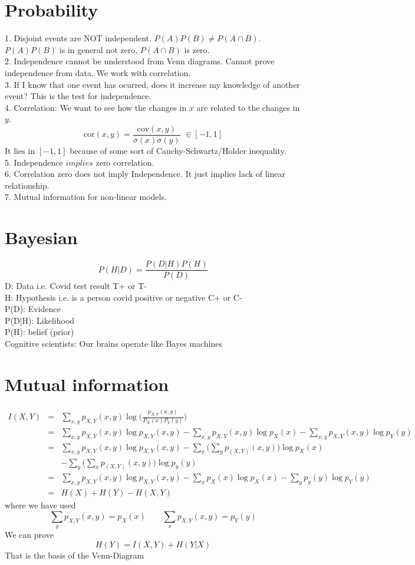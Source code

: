 \documentclass{article}
\newcommand{\beq}{\begin{equation}}
\newcommand{\eeq}{\end{equation}}
\newcommand{\ber}{\begin{eqnarray}}
\newcommand{\eer}{\end{eqnarray}}
\begin{document}
\section{Probability}
1. Disjoint events are NOT independent. $P(A)P(B)\ne{}P(A\cap{B})$. $P(A)P(B)$ is in general not zero, $P(A\cap{B})$ is zero.\\
2. Independence cannot be understood from Venn diagrams. Cannot prove independence from data. We work with correlation. \\
3. If I know that one event has ocurred, does it increase my knowledge of another event? This is the test for independence. \\
4. Correlation: We want to see how the changes in $x$ are related to the changes in $y$.\\
\beq
\text{cor}(x,y) = \frac{\text{cov}(x,y)}{\sigma(x)\sigma(y)}\,\,\in [-1,1] 
\eeq
It lies in $[-1,1]$ because of some sort of Cauchy-Schwartz/Holder inequality.\\
5. Independence $implies$ zero correlation.\\
6. Correlation zero does not imply Independence. It just implies lack of linear relationship.\\
7. Mutual information for non-linear models.
%
%
%
\section{Bayesian}
\beq
P(H|D) = \frac{P(D|H)P(H)}{P(D)}
\eeq
D: Data i.e. Covid test result T+ or T-\\
H: Hypothesis i.e. is a person covid positive or negative C+ or C-\\
P(D): Evidence\\
P(D|H): Likelihood\\
P(H): belief (prior)\\
Cognitive scientists: Our brains operate like Bayes machines
%
%
%
\section{Mutual information}
\ber
I(X,Y) &=& \sum_{x,y}p_{X,Y}(x,y)\log\Big(\frac{p_{X,Y}(x,y)}{P_X(x)P_Y(y)}\Big)\\
&=& \sum_{x,y}p_{X,Y}(x,y)\log{p_{X,Y}(x,y)} - \sum_{x,y}p_{X,Y}(x,y)\log{p_X(x)} - \sum_{x,y}p_{X,Y}(x,y)\log{p_Y(y)} \\
&=& \sum_{x,y}p_{X,Y}(x,y)\log{p_{X,Y}(x,y)} - \sum_{x}\Big(\sum_{y}p_(X,Y)(x,y)\Big)\log{p_X(x)} \nonumber \\ && - \sum_{y}\Big(\sum_{x}p_(X,Y)(x,y)\Big)\log{p_y(y)} \\
&=& \sum_{x,y}p_{X,Y}(x,y)\log{p_{X,Y}(x,y)} - \sum_{x}p_{X}(x)\log{p_X(x)} - \sum_{y}p_{y}(y)\log{p_Y(y)} \\
&=& H(X) + H(Y) - H(X,Y)
\eer
where we have used
\beq
\sum_{y}p_{X,Y}(x,y) = p_{X}(x) \qquad \sum_{x}p_{X,Y}(x,y) = p_{Y}(y)
\eeq
We can prove
\beq
H(Y) = I(X,Y) + H(Y|X)
\eeq
That is the basis of the Venn-Diagram
%
%
%
\end{document}
